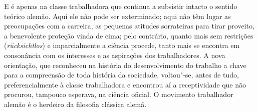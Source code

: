 E é apenas na classe trabalhadora que continua a subsistir intacto o
sentido teórico alemão. Aqui ele não pode ser exterminado; aqui não têm
lugar as preocupações com a carreira, as pequenas atitudes sorrateiras
para tirar proveito, a benevolente proteção vinda de cima; pelo
contrário, quanto mais sem restrições (\emph{rücksichtlos}) e
imparcialmente a ciência procede, tanto mais se encontra em consonância
com os interesses e as aspirações dos trabalhadores. A nova orientação,
que reconheceu na história do desenvolvimento do trabalho a chave para a
compreensão de toda história da sociedade, voltou"-se, antes de tudo,
preferencialmente à classe trabalhadora e encontrou aí a receptividade
que não procurou, tampouco esperava, na ciência oficial. O movimento
trabalhador alemão é o herdeiro da filosofia clássica alemã.
